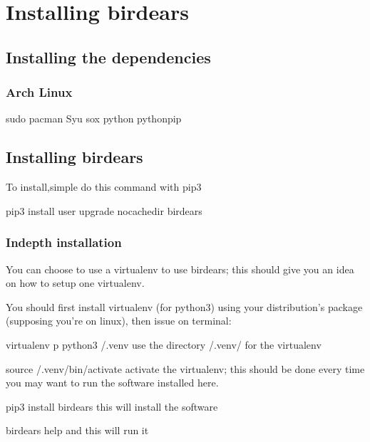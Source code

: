 \documentclass[letterpaper,10pt,english]{sphinxmanual}
\begin{document}
\chapter{Installing birdears}
\label{\detokenize{installing:installing-birdears}}\label{\detokenize{installing::doc}}

\section{Installing the dependencies}
\label{\detokenize{installing:installing-the-dependencies}}

\subsection{Arch Linux}
\label{\detokenize{installing:arch-linux}}
\begin{sphinxVerbatim}[commandchars=\\\{\}]
sudo pacman \PYGZhy{}Syu sox python python\PYGZhy{}pip
\end{sphinxVerbatim}


\section{Installing birdears}
\label{\detokenize{installing:id1}}
\sphinxAtStartPar
To install,simple do this command with pip3

\begin{sphinxVerbatim}[commandchars=\\\{\}]
pip3 install \PYGZhy{}\PYGZhy{}user \PYGZhy{}\PYGZhy{}upgrade \PYGZhy{}\PYGZhy{}no\PYGZhy{}cache\PYGZhy{}dir birdears
\end{sphinxVerbatim}


\subsection{In\sphinxhyphen{}depth installation}
\label{\detokenize{installing:in-depth-installation}}
\sphinxAtStartPar
You can choose to use a virtualenv to use birdears; this should give you
an idea on how to setup one virtualenv.

\sphinxAtStartPar
You should first install virtualenv (for python3) using your
distribution’s package (supposing you’re on linux), then issue on terminal:

\begin{sphinxVerbatim}[commandchars=\\\{\}]
virtualenv \PYGZhy{}p python3 \PYGZti{}/.venv \PYGZsh{} use the directory \PYGZti{}/.venv/ for the virtualenv

source \PYGZti{}/.venv/bin/activate   \PYGZsh{} activate the virtualenv; this should be done
                              \PYGZsh{} every time you may want to run the software
                              \PYGZsh{} installed here.

pip3 install birdears         \PYGZsh{} this will install the software

birdears \PYGZhy{}\PYGZhy{}help               \PYGZsh{} and this will run it
\end{sphinxVerbatim}
\end{document}
